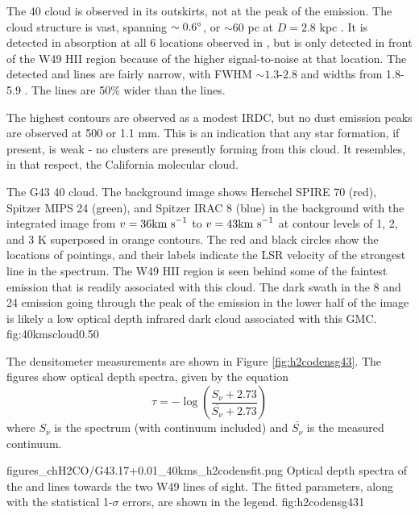 The 40 \kms cloud is observed in its outskirts, not at the peak of the
\thirteenco emission.  The cloud structure is vast, spanning $\sim0.6^{\circ}$, 
or $\sim60$ pc at $D=2.8$ kpc \citep{Roman-Duval2009}.  It is detected in \oneone
absorption at all 6 locations observed in \formaldehyde, but \twotwo is only
detected in front of the W49 HII region because of the higher signal-to-noise at
that location.  The detected \thirteenco and \formaldehyde lines are fairly
narrow, with \formaldehyde FWHM $\sim1.3$-$2.8$ \kms and \thirteenco widths
from 1.8-5.9 \kms.  The \thirteenco lines are 50\% wider than the \formaldehyde
lines.

The highest \thirteenco contours are observed as a modest IRDC, but no dust
emission peaks are observed at 500 \um or 1.1 mm.  This is an indication that
any star formation, if present, is weak - no clusters are presently forming
from this cloud.   It resembles, in that respect, the California molecular
cloud.

{The G43 40 \kms cloud.  The background image shows Herschel SPIRE 70 \um (red),
Spitzer MIPS 24 \um (green), and Spitzer IRAC 8 \um (blue) in the background with
the \thirteenco integrated image from $v=36 \textrm{km~s}^{-1}$ to $v=43 \textrm{km~s}^{-1}$ at contour levels of
1, 2, and 3 K superposed in orange contours.  The red and black circles
show the locations of \formaldehyde pointings, and their labels indicate the LSR velocity
of the strongest line in the spectrum.  The W49 HII region is seen
behind some of the faintest \thirteenco emission that is readily associated
with this cloud.  The dark swath in the 8 and 24 \um emission going through the
peak of the \thirteenco emission in the lower half of the image is likely a low
optical depth infrared dark cloud associated with this GMC.}
{fig:40kmscloud}{0.5}{0}

The \formaldehyde densitometer measurements are shown in Figure \ref{fig:h2codensg43}.
The figures show optical depth spectra, given by the equation
$$\tau = -\log\left(\frac{S_\nu + 2.73}{\bar{S_\nu} + 2.73}\right)$$
where $S_\nu$ is the spectrum (with continuum included) and $\bar{S_\nu}$ is
the measured continuum.

{figures_chH2CO/G43.17+0.01_40kms_h2codensfit.png}
{Optical depth spectra of the \oneone and \twotwo lines towards the two W49 lines
of sight.  The fitted parameters, along with the statistical 1-$\sigma$ errors,
are shown in the legend.}
{fig:h2codensg43}{1}

